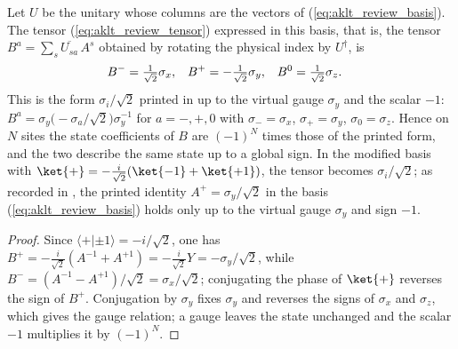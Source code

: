 \begin{lemma}\label{thm:aklt_review_pauli_form}
    \leanok
    Let $U$ be the unitary whose columns are the vectors of
    (\ref{eq:aklt_review_basis}). The tensor (\ref{eq:aklt_review_tensor})
    expressed in this basis, that is, the tensor $B^{a}=\sum_{s}\overline{U_{sa}}\,A^{s}$
    obtained by rotating the physical index by $U^{\dagger}$, is
    \begin{align}
        B^{-} & = \tfrac{1}{\sqrt2}\sigma_x,
              & B^{+}                        & = -\tfrac{1}{\sqrt2}\sigma_y,
              & B^{0}                        & = \tfrac{1}{\sqrt2}\sigma_z.
        \notag
    \end{align}
    This is the form $\sigma_i/\sqrt2$ printed in
    \cite[Appendix~A, ``The AKLT state'']{Cirac2021Matrix} up to the virtual
    gauge $\sigma_y$ and the scalar $-1$: $B^{a}=\sigma_y\big(-\sigma_a/\sqrt2\big)\sigma_y^{-1}$
    for $a=-,+,0$ with $\sigma_-=\sigma_x$, $\sigma_+=\sigma_y$, $\sigma_0=\sigma_z$.
    Hence on $N$ sites the state coefficients of $B$ are $(-1)^N$ times those of
    the printed form, and the two describe the same state up to a global sign.
    In the modified basis with $\ket{+}=-\frac{i}{\sqrt2}(\ket{-1}+\ket{+1})$,
    the tensor becomes $\sigma_i/\sqrt2$; as recorded in
    \cite{gap:rmp_aklt_pauli_basis_sign}, the printed identity
    $A^{+}=\sigma_y/\sqrt2$ in the basis (\ref{eq:aklt_review_basis}) holds
    only up to the virtual gauge $\sigma_y$ and sign $-1$.
\end{lemma}
\begin{proof}
    \leanok
    Since $\langle +|\pm1\rangle=-i/\sqrt2$, one has
    $B^{+}=-\frac{i}{\sqrt2}(A^{-1}+A^{+1})=-\frac{i}{\sqrt2}Y=-\sigma_y/\sqrt2$,
    while $B^{-}=(A^{-1}-A^{+1})/\sqrt2=\sigma_x/\sqrt2$; conjugating the phase
    of $\ket{+}$ reverses the sign of $B^{+}$. Conjugation by $\sigma_y$ fixes
    $\sigma_y$ and reverses the signs of $\sigma_x$ and $\sigma_z$, which gives
    the gauge relation; a gauge leaves the state unchanged and the scalar $-1$
    multiplies it by $(-1)^N$.
\end{proof}

